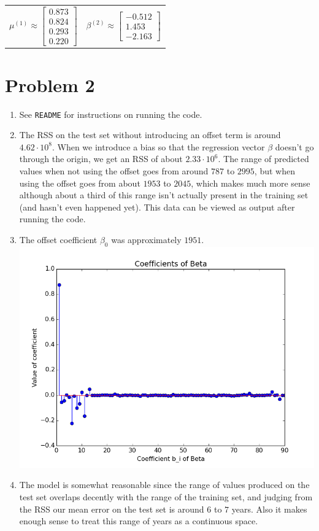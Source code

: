 \documentclass[11pt]{article}
\begin{document}
\begin{enumerate}[1.]
\begin{tabular}{cc}
$\mu^{(1)} \approx \begin{bmatrix}0.873\\0.824\\0.293\\0.220\end{bmatrix}$ & $\beta^{(2)} \approx \begin{bmatrix}-0.512\\1.453\\-2.163\end{bmatrix}$
\end{tabular}
\end{enumerate}


\newpage
\section*{Problem 2}
\begin{enumerate}[1.]
\item See \texttt{README} for instructions on running the code.
\item The RSS on the test set without introducing an offset term is around $4.62\cdot10^8$. When we introduce a bias so that the regression vector $\beta$ doesn't go through the origin, we get an RSS of about $2.33\cdot10^6$. The range of predicted values when not using the offset goes from around $787$ to $2995$, but when using the offset goes from about $1953$ to $2045$, which makes much more sense although about a third of this range isn't actually present in the training set (and hasn't even happened yet). This data can be viewed as output after running the code.
\item The offset coefficient $\beta_0$ was approximately $1951$.\\
\includegraphics[scale=0.7]{images/p2}
\item The model is somewhat reasonable since the range of values produced on the test set overlaps decently with the range of the training set, and judging from the RSS our mean error on the test set is around $6$ to $7$ years. Also it makes enough sense to treat this range of years as a continuous space.
\end{enumerate}
\end{document}
